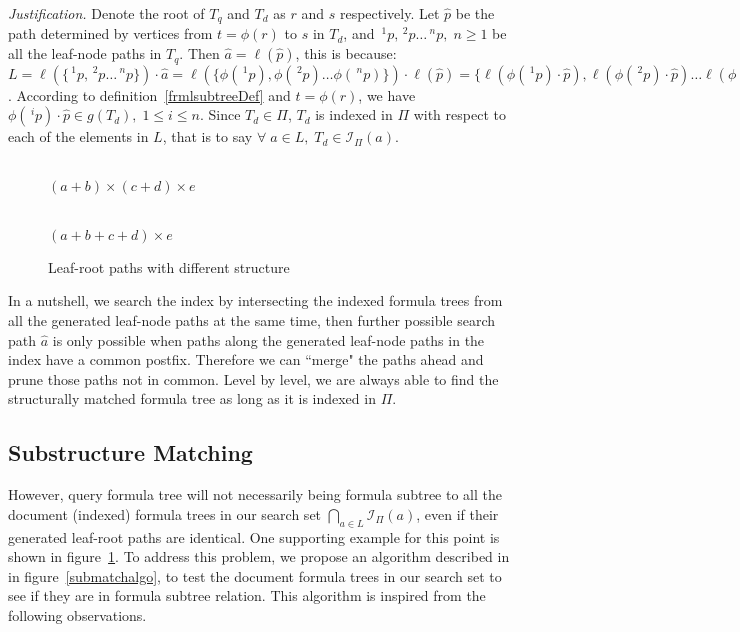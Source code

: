 \documentclass{acm_proc_article-sp}
\begin{document}
\textit{Justification.}
Denote the root of $T_q$ and $T_d$ as $r$ and $s$ respectively.
Let $\hat{p}$ be the path determined by vertices from $t=\phi(r)$ to $s$ in $T_d$,
and $\,^1p, \,^2p \ldots \,^np,\; n \ge 1$ be all the leaf-node paths in $T_q$.
Then $\hat{a} = \ell(\hat{p})$, this is because:
$L = \ell(\{ \,^1p, \,^2p \ldots \,^np \}) \cdot \hat{a} = 
\ell(\{ \phi(\,^1p), \phi(\,^2p) \ldots \phi(\,^np) \}) \cdot \ell(\hat{p}) =
\{ \ell(\phi(\,^1p) \cdot \hat{p}), \ell(\phi(\,^2p) \cdot \hat{p}) \ldots \ell(\phi(\,^np) \cdot \hat{p}) \}
$.
According to definition~\ref{frmlsubtreeDef} and $t=\phi(r)$, we have $\phi(\,^ip) \cdot \hat{p} \in g(T_d),\; 1 \le i \le n$.
Since $ T_d \in \Pi$, $T_d$ is indexed in $\Pi$ with respect to each of the elements in $L$, that is to say $\forall\; a \in L, \; T_d \in \mathcal{I}_{\Pi}(a)$.

\begin{figure}
\begin{minipage}[b]{1.65in}
\begin{center}
\\ $(a+b) \times (c+d) \times e$
\end{center}
\end{minipage}
\hspace*{.0in}
\begin{minipage}[b]{1.60in}
\begin{center}
\\ $(a+b+c+d) \times e$
\end{center}
\end{minipage}
\caption{Leaf-root paths with different structure}\label{notnecessary}
\end{figure}

In a nutshell, we search the index by intersecting the indexed formula trees from all the generated leaf-node paths at the same time, then further possible search path $\hat{a}$ is only possible when paths along the generated leaf-node paths in the index have a common postfix.
Therefore we can ``merge" the paths ahead and prune those paths not in common. Level by level, we are always able to find the structurally matched formula tree as long as it is indexed in $\Pi$.

\subsection{Substructure Matching}
However, query formula tree will not necessarily being formula subtree to all the document (indexed) formula trees in our search set
$\bigcap_{a \in L} \mathcal{I}_{\Pi}(a)$,
even if their generated leaf-root paths are identical.
One supporting example for this point is shown in figure~\ref{notnecessary}.
To address this problem, we propose an algorithm described in in figure~\ref{submatchalgo}, to test the document formula trees in our search set to see if they are in formula subtree relation.
This algorithm is inspired from the following observations. 
\end{document}

